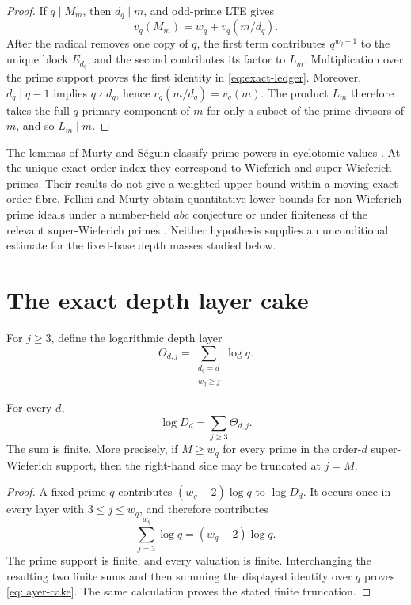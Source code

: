 \begin{proof}
If $q\mid M_m$, then $d_q\mid m$, and odd-prime LTE gives
\[
 v_q(M_m)=w_q+v_q(m/d_q).
\]
After the radical removes one copy of $q$, the first term contributes
$q^{w_q-1}$ to the unique block $E_{d_q}$, and the second contributes its
factor to $L_m$.  Multiplication over the prime support proves the first
identity in \eqref{eq:exact-ledger}.  Moreover, $d_q\mid q-1$ implies
$q\nmid d_q$, hence $v_q(m/d_q)=v_q(m)$.  The product $L_m$ therefore takes
the full $q$-primary component of $m$ for only a subset of the prime
divisors of $m$, and so $L_m\mid m$.
\end{proof}

The lemmas of Murty and S\'eguin classify prime powers in cyclotomic values
\cite[Lemmas~4.2--4.3]{MurtySeguin2019}.  At the unique exact-order index
they correspond to Wieferich and super-Wieferich primes.  Their results do not give a
weighted upper bound within a moving exact-order fibre.  Fellini and Murty
obtain quantitative lower bounds for non-Wieferich prime ideals under a
number-field $abc$ conjecture or under finiteness of the relevant
super-Wieferich primes \cite[Theorems~1.2--1.4]{FelliniMurty2026}.  Neither
hypothesis supplies an unconditional estimate for the fixed-base depth
masses studied below.

\section{The exact depth layer cake}
\label{sec:layer-cake}

For $j\ge3$, define the logarithmic depth layer
\begin{equation}
  \Theta_{d,j}
   =\sum_{\substack{d_q=d\\w_q\ge j}}\log q.
  \label{eq:depth-layer}
\end{equation}

\begin{proposition}
\label{prop:layer-cake}
For every $d$,
\begin{equation}
                    \log D_d=\sum_{j\ge3}\Theta_{d,j}.
  \label{eq:layer-cake}
\end{equation}
The sum is finite.  More precisely, if $M\ge w_q$ for every prime in the
order-$d$ super-Wieferich support, then the right-hand side may be
truncated at $j=M$.
\end{proposition}

\begin{proof}
A fixed prime $q$ contributes $(w_q-2)\log q$ to $\log D_d$.  It occurs
once in every layer with $3\le j\le w_q$, and therefore contributes
\[
              \sum_{j=3}^{w_q}\log q=(w_q-2)\log q.
\]
The prime support is finite, and every valuation is finite.  Interchanging
the resulting two finite sums and then summing the displayed identity over
$q$ proves \eqref{eq:layer-cake}.  The same calculation proves the stated
finite truncation.
\end{proof}

